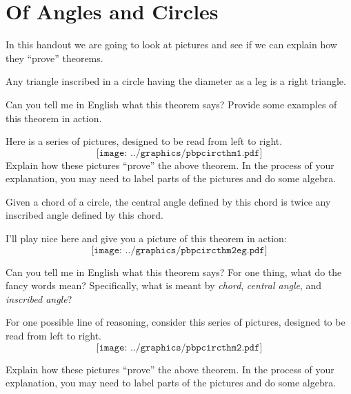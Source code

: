 \newpage
\section{Of Angles and Circles} %

In this handout we are going to look at pictures and see if we can
explain how they ``prove'' theorems.


\begin{theorem} 
Any triangle inscribed in a circle having the diameter as a leg is a
right triangle.
\end{theorem}

\begin{prob}
Can you tell me in English what this theorem says? Provide some
examples of this theorem in action.
\end{prob}

\begin{prob} 
Here is a series of pictures, designed to be read from left to right.
\[
\texttt{[image: ../graphics/pbpcircthm1.pdf]}
\]
Explain how these pictures ``prove'' the above theorem. In the process
of your explanation, you may need to label parts of the pictures and
do some algebra.
\end{prob}


\begin{theorem} 
Given a chord of a circle, the central angle defined by this chord is
twice any inscribed angle defined by this chord.
\end{theorem}

I'll play nice here and give you a picture of this theorem in action:
\[
\texttt{[image: ../graphics/pbpcircthm2eg.pdf]}
\]

\begin{prob}
Can you tell me in English what this theorem says? For one thing, what
do the fancy words mean? Specifically, what is meant by
\textit{chord}, \textit{central angle}, and \textit{inscribed angle}?
\end{prob}

\begin{prob} 
For one possible line of reasoning, consider this series of pictures, designed to be read from left to right.
\[
\texttt{[image: ../graphics/pbpcircthm2.pdf]}
\]

Explain how these pictures ``prove'' the above theorem. In the process
of your explanation, you may need to label parts of the pictures and
do some algebra.
\end{prob}

